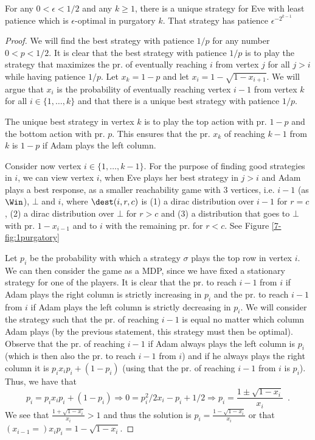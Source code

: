 \begin{lemma}\label{lem:purgatory}
For any $0<\epsilon<1/2$ and any $k\geq 1$, there is a unique strategy for Eve with least patience which is $\epsilon$-optimal in purgatory $k$. That strategy has patience $\epsilon^{-2^{k-1}}$
\end{lemma}
\begin{proof}
We will find the best strategy with patience $1/p$ for any number $0<p<1/2$.
It is clear that the best strategy with patience $1/p$ is to play the strategy that maximizes the pr. of eventually reaching $i$ from vertex $j$ for all $j>i$ while having patience $1/p$.
Let $x_k=1-p$ and let $x_i=1-\sqrt{1-x_{i+1}}$. We will argue that $x_i$ is the probability of eventually reaching vertex $i-1$ from vertex $k$ for all $i\in \{1,\dots,k\}$ and that there is a unique best strategy with patience $1/p$.

The unique best strategy in vertex $k$ is to play the top action with pr. $1-p$ and the bottom action with pr. $p$. This ensures that the pr. $x_k$ of reaching $k-1$ from $k$ is $1-p$ if Adam plays the left column.

Consider now vertex $i\in \{1,\dots,k-1\}$.
For the purpose of finding good strategies in $i$, we can view vertex $i$, when Eve plays her best strategy in $j>i$ and Adam plays a best response, as a smaller reachability game with 3 vertices, i.e. $i-1$ (as $\Win$), $\bot$ and $i$, where $\dest(i,r,c)$ is (1) a dirac distribution over $i-1$ for $r=c$, (2) a dirac distribution over $\bot$ for $r>c$ and (3) a distribution that goes to $\bot$ with pr. $1-x_{i-1}$ and to $i$ with the remaining pr. for $r<c$. See Figure \cref{7-fig:1purgatory}


Let $p_i$ be the probability with which a strategy $\sigma$ plays the top row in vertex $i$.
We can then consider the game as a MDP, since we have fixed a stationary strategy for one of the players.
It is clear that the pr. to reach $i-1$ from $i$ if Adam plays the right column is strictly increasing in $p_i$ and the pr. to reach $i-1$ from $i$ if Adam plays the left column is strictly decreasing in $p_i$. We will consider the strategy such that the pr. of reaching $i-1$ is equal no matter which column Adam plays (by the previous statement, this strategy must then be optimal).
Observe that the pr. of reaching $i-1$ if Adam always plays the left column is $p_i$ (which is then also the pr. to reach $i-1$ from $i$) and if he always plays the right column it is  $p_i x_i p_i+(1-p_i)$ (using that the pr. of reaching $i-1$ from $i$ is $p_i$).
Thus, we have that 
\[
p_i=p_i x_i p_i+(1-p_i)\Rightarrow 0=p_i^2/2 x_i-p_i+1/2 \Rightarrow p_i=\frac{1\pm \sqrt{1-x_i}}{x_i}\enspace .\] We see that $\frac{1+ \sqrt{1-x_i}}{x_i}>1$ and thus the solution is $p_i=\frac{1- \sqrt{1-x_i}}{x_i}$ or that $(x_{i-1}=)x_ip_i=1- \sqrt{1-x_i}$.


\end{proof}
